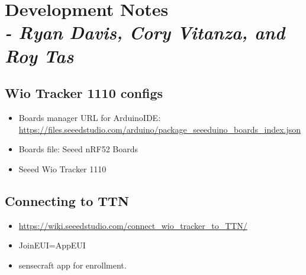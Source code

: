 \chapter{Development Notes \\
\small{\textit{- Ryan Davis, Cory Vitanza, and Roy Tas}}}
\label{Chapter::DevelopmentNotes}

\section{Wio Tracker 1110 configs}
\begin{itemize}
    \item Boards manager URL for ArduinoIDE: \url{https://files.seeedstudio.com/arduino/package_seeeduino_boards_index.json}
    \item Boards file: Seeed nRF52 Boards
    \item Seeed Wio Tracker 1110
\end{itemize}

\section{Connecting to TTN}
\begin{itemize}
    \item \url{https://wiki.seeedstudio.com/connect_wio_tracker_to_TTN/}
    \item JoinEUI=AppEUI
    \item sensecraft app for enrollment.
\end{itemize}